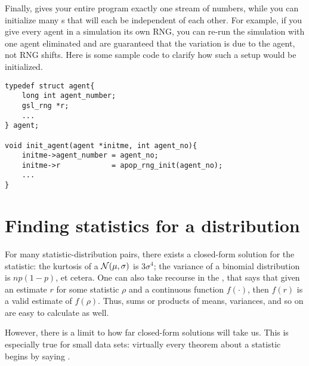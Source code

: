 Finally,  gives your entire
program exactly one stream of numbers, while you can initialize many
s that will each be independent of each other. 
For example,
if you give every agent in a simulation its own RNG, you can re-run the
simulation with one agent eliminated and are guaranteed that the
variation is due to the agent, not RNG shifts. Here is some sample code
to clarify how such a setup would be initialized.
\begin{lstlisting}
typedef struct agent{
    long int agent_number;
    gsl_rng *r;
    ...
} agent;

void init_agent(agent *initme, int agent_no){
    initme->agent_number = agent_no;
    initme->r            = apop_rng_init(agent_no);
    ...
}
\end{lstlisting}




\section{Finding statistics for a distribution} \label{billiondraws}
For many statistic-distribution pairs, there exists a closed-form
solution for the statistic: the kurtosis of a ${\cal N}(\mu,\sigma)$
is $3\sigma^4$; the variance of a binomial distribution is $np(1-p)$,
et cetera. One can also take recourse in the , that
says that given an estimate $r$ for some statistic $\rho$ and a continuous
function $f(\cdot)$, then $f(r)$ is a valid estimate of $f(\rho)$. Thus,
sums or products of means, variances, and so on are easy to calculate as well.

However, there is a limit to how far closed-form solutions will take us.
This is especially true for small data sets: virtually every theorem
about a statistic begins by saying .

